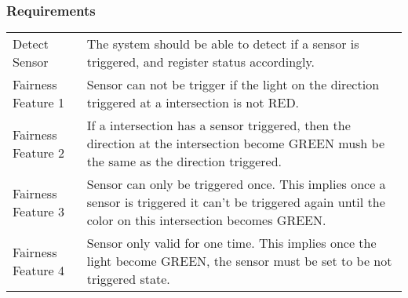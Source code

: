 \documentclass[a4paper]{article}
\begin{document}
\subsubsection{Requirements}
\begin{center}
\begin{tabular}{|p{3.5cm}|p{10cm}|}
\hline
\color{blue}{Requirements} & \color{blue}{Function}\\
\hline
  Detect Sensor & The system should be able to detect if a sensor is triggered, and register status accordingly.\\
  \hline
  Fairness Feature 1& Sensor can not be trigger if the light on the direction triggered at a intersection is not RED.\\
  \hline
  Fairness Feature 2 & If a intersection has a sensor triggered, then the direction at the intersection become GREEN mush be the same as the direction triggered.\\
  \hline
  Fairness Feature 3 & Sensor can only be triggered once. \linebreak This implies once a sensor is triggered it can't be triggered again until the color on this intersection becomes GREEN.\\
  \hline
   Fairness Feature 4 & Sensor only valid for one time. \linebreak This implies once the light become GREEN, the sensor must be set to be not triggered state.\\
  \hline
\end{tabular}
\end{center}
\end{document}
